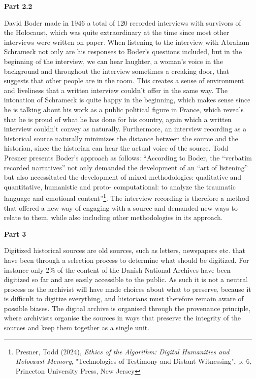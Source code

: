 \documentclass[%
  final,  %
  12pt,  %
  british,
  a4paper
]{article}
\begin{document}
\noindent\textbf{Part 2.2}

\noindent David Boder made in 1946 a total of 120 recorded interviews with survivors of the Holocaust, which was quite extraordinary at the time since most other interviews were written on paper. When listening to the interview with Abraham Schrameck not only are his responses to Boder’s questions included, but in the beginning of the interview, we can hear laughter, a woman’s voice in the background and throughout the interview sometimes a creaking door, that suggests that other people are in the room. This creates a sense of environment and liveliness that a written interview couldn’t offer in the same way. The intonation of Schrameck is quite happy in the beginning, which makes sense since he is talking about his work as a public political figure in France, which reveals that he is proud of what he has done for his country, again which a written interview couldn’t convey as naturally. Furthermore, an interview recording as a historical source naturally minimizes the distance between the source and the historian, since the historian can hear the actual voice of the source. Todd Presner presents Boder’s approach as follows: “According to Boder, the “verbatim recorded narratives” not only demanded the development of an “art of listening” but also necessitated the development of mixed methodologies: qualitative and quantitative, humanistic and proto- computational: to analyze the traumatic language and emotional content”\footnote{Presner, Todd (2024),\textit{ Ethics of the Algorithm: Digital Humanities and Holocaust Memory}, "Technologies of Testimony and Distant Witnessing", p. 6, Princeton University Press, New Jersey}. The interview recording is therefore a method that offered a new way of engaging with a source and demanded new ways to relate to them, while also including other methodologies in its approach.\newline

\noindent\textbf{Part 3}

\noindent Digitized historical sources are old sources, such as letters, newspapers etc. that have been through a selection process to determine what should be digitized. For instance only 2\% of the content of the Danish National Archives have been digitized so far and are easily accessible to the public. As such it is not a neutral process as the archivist will have made choices about what to preserve, because it is difficult to digitize everything, and historians must therefore remain aware of possible biases. The digital archive is organised through the provenance principle, where archivists organise the sources in ways that preserve the integrity of the sources and keep them together as a single unit. 
\end{document}
